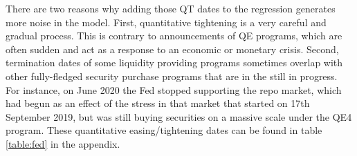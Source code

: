 \documentclass[11pt,a4paper,english,oneside]{article}
\begin{document}
There are two reasons why adding those QT dates to the regression generates more noise in the model. First, quantitative tightening is a very careful and gradual process. This is contrary to announcements of QE programs, which are often sudden and act as a response to an economic or monetary crisis. Second, termination dates of some liquidity providing programs sometimes overlap with other fully-fledged security purchase programs that are in the still in progress. For instance, on June 2020 the Fed stopped supporting the repo market, which had begun as an effect of the stress in that market that started on 17th September 2019, but was still buying securities on a massive scale under the QE4 program. These quantitative easing/tightening dates can be found in table \ref{table:fed} in the appendix.

\end{document}
